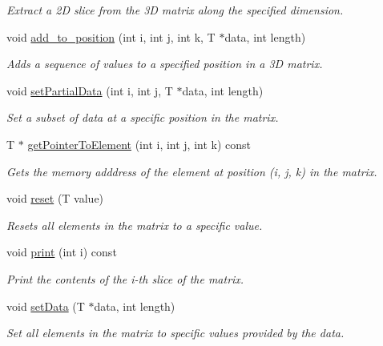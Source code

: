 \begin{DoxyCompactItemize}
\begin{DoxyCompactList}\small\item\em Extract a 2D slice from the 3D matrix along the specified dimension. \end{DoxyCompactList}\item 
void \mbox{\hyperlink{classMatrix3D_a61afc3a397203f453f60772ebc10758a}{add\+\_\+to\+\_\+position}} (int i, int j, int k, T $\ast$data, int length)
\begin{DoxyCompactList}\small\item\em Adds a sequence of values to a specified position in a 3D matrix. \end{DoxyCompactList}\item 
void \mbox{\hyperlink{classMatrix3D_a46a7b732a44b77f6c09f72c0ae05edef}{set\+Partial\+Data}} (int i, int j, T $\ast$data, int length)
\begin{DoxyCompactList}\small\item\em Set a subset of data at a specific position in the matrix. \end{DoxyCompactList}\item 
T $\ast$ \mbox{\hyperlink{classMatrix3D_ac21cf8967053b928f609b98abf1616e2}{get\+Pointer\+To\+Element}} (int i, int j, int k) const
\begin{DoxyCompactList}\small\item\em Gets the memory adddress of the element at position (i, j, k) in the matrix. \end{DoxyCompactList}\item 
void \mbox{\hyperlink{classMatrix3D_ac67d3ee632ccafaac86dfacdda95dfdf}{reset}} (T value)
\begin{DoxyCompactList}\small\item\em Resets all elements in the matrix to a specific value. \end{DoxyCompactList}\item 
void \mbox{\hyperlink{classMatrix3D_abc1d3451a2fb3cce0bec1d1e33097b1e}{print}} (int i) const
\begin{DoxyCompactList}\small\item\em Print the contents of the i-\/th slice of the matrix. \end{DoxyCompactList}\item 
void \mbox{\hyperlink{classMatrix3D_a056c035f4997b14c2a3e2b8ebee5142c}{set\+Data}} (T $\ast$data, int length)
\begin{DoxyCompactList}\small\item\em Set all elements in the matrix to specific values provided by the data. \end{DoxyCompactList}\item 

\end{DoxyCompactItemize}
